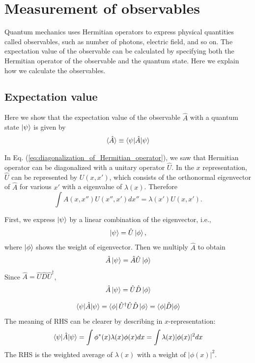 \section{Measurement of observables}
Quantum mechanics uses Hermitian operators to express physical quantities called observables, such as number of photons, electric field, and so on. The expectation value of the observable can be calculated by specifying both the Hermitian operator of the observable and the quantum state. Here we explain how we calculate the observables.
 
\subsection{Expectation value}
Here we show that the expectation value of the observable $\hat A$ with a quantum state $\ket \psi$ is given by
\begin{equation}
  \braket{\hat A} \equiv \braket{\psi|\hat A|\psi}
\end{equation}

In Eq. (\ref{eq:diagonalization_of_Hermitian_operator}), we saw that Hermitian operator can be diagonalized with a unitary operator $\hat U$. In the $x$ representation, $\hat U$ can be represented by $U(x,x')$, which consists of the orthonormal eigenvector of $\hat A$ for various $x'$ with a eigenvalue of $\lambda(x)$. Therefore
\begin{equation}
  \int A(x,x'')U(x'', x')dx'' = \lambda(x')U(x,x').
\end{equation}

First, we express $\ket \psi$ by a linear combination of the eigenvector, i.e.,
\begin{equation}
  \ket \psi = \hat U \ket \phi,
\end{equation}
where $\ket \phi$ shows the weight of eigenvector. Then we multiply $\hat A$ to obtain
\begin{equation}
  \hat A \ket \psi = \hat A \hat U \ket \phi
\end{equation}
Since $\hat A = \hat U\hat D\hat U^\dagger$,
\begin{equation}
  \hat A \ket \psi = \hat U\hat D \ket \phi
\end{equation}

\begin{equation}
  \braket{\psi|\hat A | \psi} = \bra \phi \hat U^\dagger \hat U \hat D \ket \phi = \braket {\phi|\hat D|\phi}
\end{equation}
The meaning of RHS can be clearer by describing in $x$-representation:
\begin{equation}
    \braket{\psi|\hat A | \psi}= \int \phi^*(x)\lambda(x)\phi(x)dx = \int \lambda(x)|\phi(x)|^2 dx
\end{equation}
The RHS is the weighted average of $\lambda(x)$ with a weight of $|\phi(x)|^2$.

